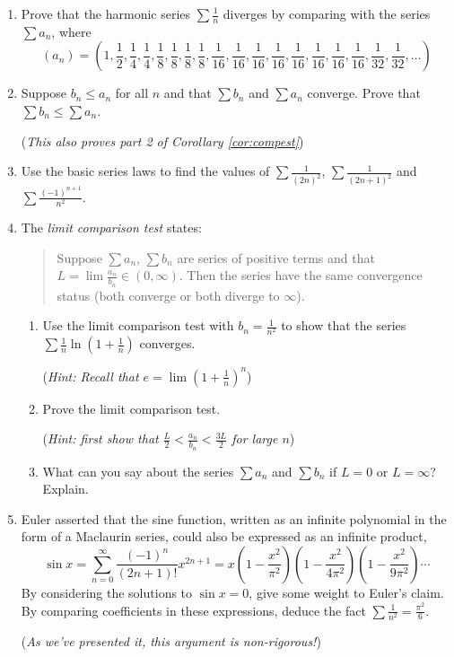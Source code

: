 \begin{exercisessec}{}{}
\begin{enumerate}
	  \item%
	  Prove that the harmonic series $\sum\frac 1n$ diverges by comparing with the series $\sum a_n$, where
	  \[(a_n)=\textstyle\left(1,\frac 12,\frac 14,\frac 14,\frac 18,\frac 18,\frac 18,\frac 18,\frac 1{16},\frac 1{16},\frac 1{16},\frac 1{16},\frac 1{16},\frac 1{16},\frac 1{16},\frac 1{16},\frac 1{32},\frac 1{32},\ldots\right)\]
	  
	  
	  \item Suppose $b_n\le a_n$ for all $n$ and that $\sum b_n$ and $\sum a_n$ converge. Prove that $\sum b_n\le \sum a_n$.\par
	  (\emph{This also proves part 2 of Corollary \ref{cor:compest}})

	
		\item Use the basic series laws to find the values of $\sum \frac 1{(2n)^2}$, $\sum\frac 1{(2n+1)^2}$ and $\sum\frac{(-1)^{n+1}}{n^2}$.

	
	\item The \emph{limit comparison test} states:
  \begin{quote}
  	Suppose $\sum a_n$, $\sum b_n$ are series of positive terms and that $L=\lim\frac{a_n}{b_n}\in(0,\infty)$. Then the series have the same convergence status (both converge or both diverge to $\infty$).
  \end{quote}
  \begin{enumerate}
    \item Use the limit comparison test with $b_n=\frac 1{n^2}$ to show that the series $\sum\frac 1n\ln\left(1+\frac 1n\right)$ converges.\par
    (\emph{Hint: Recall that $e=\lim\left(1+\frac 1n\right)^n$})
    	
    \item Prove the limit comparison test.\par
    (\emph{Hint: first show that $\frac L2<\frac{a_n}{b_n}<\frac{3L}2$ for large $n$})
    	
    \item What can you say about the series $\sum a_n$ and $\sum b_n$ if $L=0$ or $L=\infty$? Explain.
  \end{enumerate}
  
  
	  
	  \item\label{exs:eulersum} Euler asserted that the sine function, written as an infinite polynomial in the form of a Maclaurin series, could also be expressed as an infinite product,
	  \[\sin x =\sum_{n=0}^\infty \frac{(-1)^n}{(2n+1)!}x^{2n+1} =x\left(1-\frac{x^2}{\pi^2}\right)\left(1-\frac{x^2}{4\pi^2}\right)\left(1-\frac{x^2}{9\pi^2}\right)\cdots \]
	  By considering the solutions to $\sin x=0$, give some weight to Euler's claim. By comparing coefficients in these expressions, deduce the fact $\sum \frac 1{n^2}=\frac{\pi^2}6$.\par
	  (\emph{As we've presented it, this argument is non-rigorous!})
	\end{enumerate}
\end{exercisessec}


